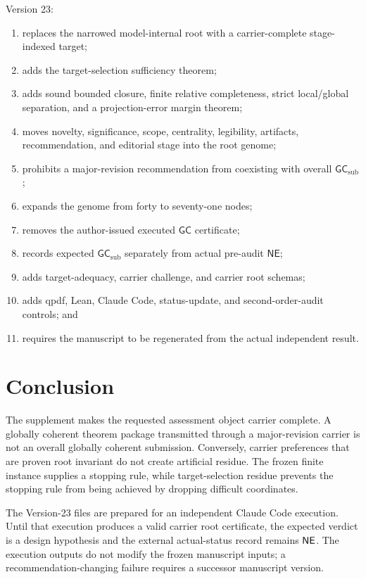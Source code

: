 \documentclass[10pt]{article}
\newcommand{\GC}{\mathsf{GC}}
\newcommand{\NE}{\mathsf{NE}}
\newcommand{\GCsub}{\mathsf{GC}_{\mathrm{sub}}}
\begin{document}
Version 23:
\begin{enumerate}
  \item replaces the narrowed model-internal root with a carrier-complete stage-indexed target;
  \item adds the target-selection sufficiency theorem;
  \item adds sound bounded closure, finite relative completeness, strict local/global separation, and a projection-error margin theorem;
  \item moves novelty, significance, scope, centrality, legibility, artifacts, recommendation, and editorial stage into the root genome;
  \item prohibits a major-revision recommendation from coexisting with overall $\GCsub$;
  \item expands the genome from forty to seventy-one nodes;
  \item removes the author-issued executed $\GC$ certificate;
  \item records expected $\GCsub$ separately from actual pre-audit $\NE$;
  \item adds target-adequacy, carrier challenge, and carrier root schemas;
  \item adds qpdf, Lean, Claude Code, status-update, and second-order-audit controls; and
  \item requires the manuscript to be regenerated from the actual independent result.
\end{enumerate}

\section{Conclusion}

The supplement makes the requested assessment object carrier complete.  A globally coherent theorem package transmitted through a major-revision carrier is not an overall globally coherent submission.  Conversely, carrier preferences that are proven root invariant do not create artificial residue.  The frozen finite instance supplies a stopping rule, while target-selection residue prevents the stopping rule from being achieved by dropping difficult coordinates.

The Version-23 files are prepared for an independent Claude Code execution.  Until that execution produces a valid carrier root certificate, the expected verdict is a design hypothesis and the external actual-status record remains $\ActualOverallGCA$.  The execution outputs do not modify the frozen manuscript inputs; a recommendation-changing failure requires a successor manuscript version.
\end{document}
